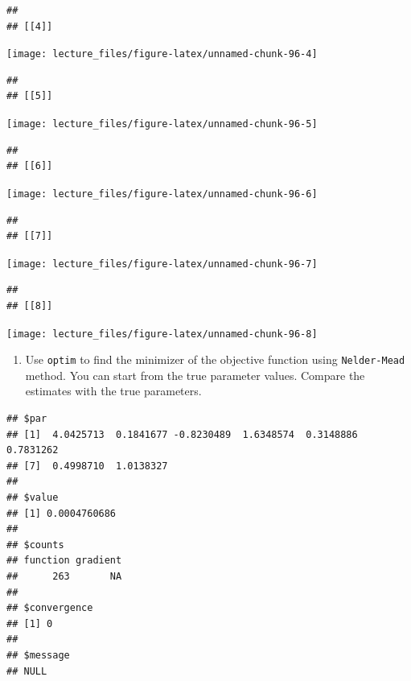 \documentclass[]{book}
\providecommand{\tightlist}{%
  \setlength{\itemsep}{0pt}\setlength{\parskip}{0pt}}
\begin{document}
\begin{verbatim}
## 
## [[4]]
\end{verbatim}

\begin{center}\texttt{[image: lecture\_files/figure-latex/unnamed-chunk-96-4]} \end{center}

\begin{verbatim}
## 
## [[5]]
\end{verbatim}

\begin{center}\texttt{[image: lecture\_files/figure-latex/unnamed-chunk-96-5]} \end{center}

\begin{verbatim}
## 
## [[6]]
\end{verbatim}

\begin{center}\texttt{[image: lecture\_files/figure-latex/unnamed-chunk-96-6]} \end{center}

\begin{verbatim}
## 
## [[7]]
\end{verbatim}

\begin{center}\texttt{[image: lecture\_files/figure-latex/unnamed-chunk-96-7]} \end{center}

\begin{verbatim}
## 
## [[8]]
\end{verbatim}

\begin{center}\texttt{[image: lecture\_files/figure-latex/unnamed-chunk-96-8]} \end{center}

\begin{enumerate}
\def\labelenumi{\arabic{enumi}.}
\setcounter{enumi}{7}
\tightlist
\item
  Use \texttt{optim} to find the minimizer of the objective function
  using \texttt{Nelder-Mead} method. You can start from the true
  parameter values. Compare the estimates with the true parameters.
\end{enumerate}

\begin{verbatim}
## $par
## [1]  4.0425713  0.1841677 -0.8230489  1.6348574  0.3148886  0.7831262
## [7]  0.4998710  1.0138327
## 
## $value
## [1] 0.0004760686
## 
## $counts
## function gradient 
##      263       NA 
## 
## $convergence
## [1] 0
## 
## $message
## NULL
\end{verbatim}
\end{document}
